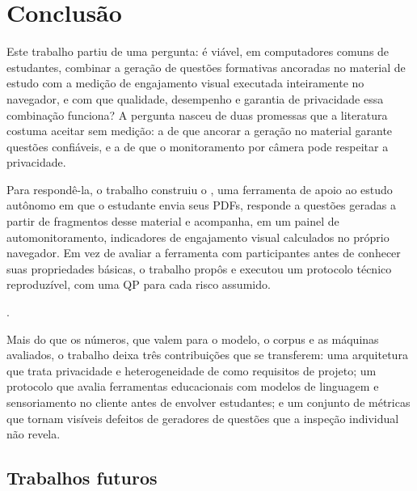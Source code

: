 \chapter{\label{chap:conclusao}Conclusão}

Este trabalho partiu de uma pergunta: é viável, em computadores comuns de estudantes, combinar a geração de questões formativas ancoradas no material de estudo com a medição de engajamento visual executada inteiramente no navegador, e com que qualidade, desempenho e garantia de privacidade essa combinação funciona? A pergunta nasceu de duas promessas que a literatura costuma aceitar sem medição: a de que ancorar a geração no material garante questões confiáveis, e a de que o monitoramento por câmera pode respeitar a privacidade.

Para respondê-la, o trabalho construiu o \ferramenta, uma ferramenta de apoio ao estudo autônomo em que o estudante envia seus PDFs, responde a questões geradas a partir de fragmentos desse material e acompanha, em um painel de automonitoramento, indicadores de engajamento visual calculados no próprio navegador. Em vez de avaliar a ferramenta com participantes antes de conhecer suas propriedades básicas, o trabalho propôs e executou um protocolo técnico reproduzível, com uma QP para cada risco assumido.

.

Mais do que os números, que valem para o modelo, o corpus e as máquinas avaliados, o trabalho deixa três contribuições que se transferem: uma arquitetura que trata privacidade e heterogeneidade de  como requisitos de projeto; um protocolo que avalia ferramentas educacionais com modelos de linguagem e sensoriamento no cliente antes de envolver estudantes; e um conjunto de métricas que tornam visíveis defeitos de geradores de questões que a inspeção individual não revela.

\section{Trabalhos futuros}


